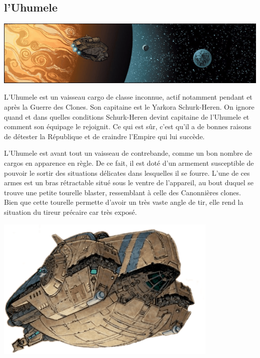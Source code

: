 \subsection{l’Uhumele}\label{sec:uhumele}
\noindent\includegraphics[width=\textwidth]{_img/songes-de-l-uhumele/uhumele-pano.png}

L'Uhumele est un vaisseau cargo de classe inconnue, actif notamment pendant et après la Guerre des Clones. Son capitaine est le Yarkora Schurk-Heren. On ignore quand et dans quelles conditions Schurk-Heren devint capitaine de l’Uhumele et comment son équipage le rejoignit. Ce qui est sûr, c'est qu’il a de bonnes raisons de détester la République et de craindre l’Empire qui lui succède.

L’Uhumele est avant tout un vaisseau de contrebande, comme un bon nombre de cargos en apparence en règle. De ce fait, il est doté d’un armement susceptible de pouvoir le sortir des situations délicates dans lesquelles il se fourre. L’une de ces armes est un bras rétractable situé sous le ventre de l’appareil, au bout duquel se trouve une petite tourelle blaster, ressemblant à celle des Canonnières clones. Bien que cette tourelle permette d’avoir un très vaste angle de tir, elle rend la situation du tireur précaire car très exposé. 

\hspace{12em}
\includegraphics[width=0.8\textwidth]{_img/songes-de-l-uhumele/uhumele.png}


